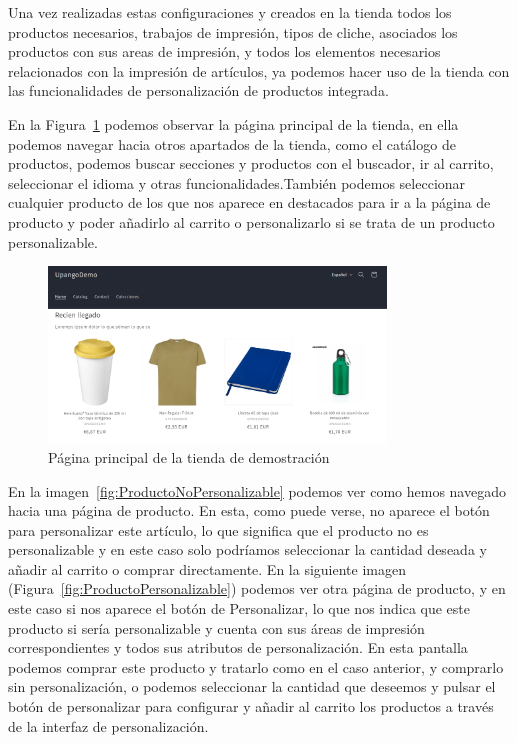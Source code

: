 \documentclass[12pt]{article}
\begin{document}
Una vez realizadas estas configuraciones y creados en la tienda todos los productos necesarios, trabajos de impresión, tipos de cliche, asociados los productos con sus areas de impresión, y todos los elementos necesarios relacionados con
la impresión de artículos, ya podemos hacer uso de la tienda con las funcionalidades de personalización de productos integrada.

En la Figura~\ref{fig:HomeTiendaDemo} podemos observar la página principal de la tienda, en ella podemos navegar hacia otros apartados de la tienda, como el catálogo de productos, podemos buscar secciones y productos con el buscador, ir al carrito, seleccionar el idioma y otras funcionalidades.También
podemos seleccionar cualquier producto de los que nos aparece en destacados para ir a la página de producto y poder añadirlo al carrito o personalizarlo si se trata de un producto
personalizable.

\begin{figure}[ht]
    \centering
    \includegraphics[width=0.8\textwidth]{imagenes/ManualUsuario/HomeTiendaDemo.png}
    \caption{\label{fig:HomeTiendaDemo}Página principal de la tienda de demostración}
    \vspace{\fill}
\end{figure}

En la imagen~\ref{fig:ProductoNoPersonalizable} podemos ver como hemos navegado hacia una página de producto. En esta, como puede verse, no aparece el botón para personalizar este
artículo, lo que significa que el producto no es personalizable y en este caso solo podríamos seleccionar la cantidad deseada y añadir al carrito o comprar directamente.
En la siguiente imagen (Figura~\ref{fig:ProductoPersonalizable}) podemos ver otra página de producto, y en este caso si nos aparece el botón de Personalizar, lo que nos indica que este producto
si sería personalizable y cuenta con sus áreas de impresión correspondientes y todos sus atributos de personalización. En esta pantalla podemos comprar este producto y tratarlo como en el caso anterior,
y comprarlo sin personalización, o podemos seleccionar la cantidad que deseemos y pulsar el botón de personalizar para configurar y añadir al carrito los productos a través de la interfaz de personalización.
\end{document}

